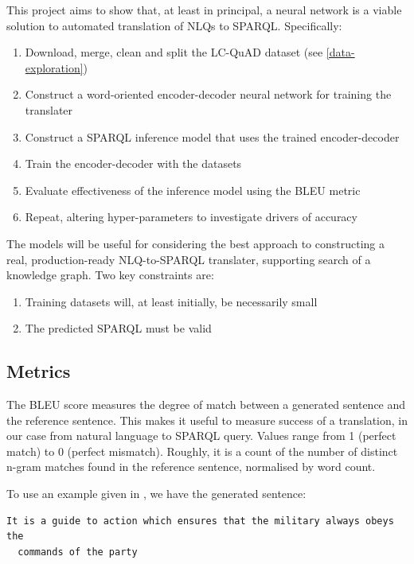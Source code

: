 \documentclass[12pt]{article}
\begin{document}
This project aims to show that, at least in principal, a neural network
is a viable solution to automated translation of NLQs to SPARQL. Specifically:

\begin{enumerate}
  \item Download, merge, clean and split the LC-QuAD dataset (see \ref{data-exploration})
  \item Construct a word-oriented encoder-decoder neural network for training the translater
  \item Construct a SPARQL inference model that uses the trained encoder-decoder
  \item Train the encoder-decoder with the datasets
  \item Evaluate effectiveness of the inference model using the BLEU metric
  \item Repeat, altering hyper-parameters to investigate drivers of accuracy
\end{enumerate}

The models will be useful for considering the best approach to 
constructing a real, production-ready NLQ-to-SPARQL translater, supporting
search of a knowledge graph. Two key constraints are:
\begin{enumerate}
  \item Training datasets will, at least initially, be necessarily small
  \item The predicted SPARQL must be valid
\end{enumerate}

\subsection{Metrics}\label{metrics}

The BLEU score measures the degree of match between a generated sentence
and the reference sentence. This makes it useful to measure success of a
translation, in our case from natural language to SPARQL query. Values
range from 1 (perfect match) to 0 (perfect mismatch). Roughly, it is a
count of the number of distinct n-gram matches found in the reference
sentence, normalised by word count.

To use an example given in \cite{papineni2002bleu}, we have the
generated sentence:
  
\begin{lstlisting}[]
  It is a guide to action which ensures that the military always obeys the
  commands of the party
\end{lstlisting}
\end{document}
